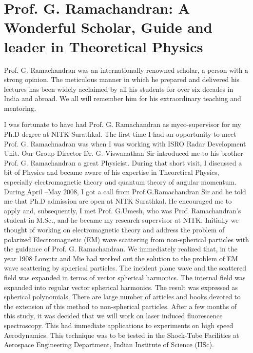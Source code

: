 \chapter{Prof. G. Ramachandran: A Wonderful Scholar, Guide and leader in Theoretical Physics}


\vspace{-.4cm}

Prof. G. Ramachandran was an internationally renowned scholar, a person with a strong opinion. The meticulous manner in which he prepared and delivered his lectures has been widely acclaimed by all his students for over six decades in India and abroad. We all will remember him for his extraordinary teaching and mentoring.

\medskip

I was fortunate to have had Prof. G. Ramachandran as my\break co-supervisor for my Ph.D degree at NITK Surathkal. The first time I had an opportunity to meet Prof. G. Ramachnadran was when I was working with ISRO Radar Development Unit. Our Group Director Dr. G. Viswanathan Sir introduced me to his brother Prof. G. Ramachandran a great Physicist. During that short visit, I discussed a bit of Physics and became aware of his expertise in Theoretical Physics, especially electromagnetic theory and quantum theory of angular momentum. During April --May 2008, I got a call from Prof.G.Ramachandran Sir and he told me that Ph.D admission are open at NITK Surathkal. He encouraged me to apply and, subsequently, I met Prof. G.Umesh, who was Prof. Ramachandran's student in M.Sc., and he became my research supervisor at NITK. Initially we thought of working on electromagnetic theory and address the problem of polarized Electromagnetic (EM) wave scattering from non-spherical particles with the guidance of Prof. G. Ramachandran. We immediately realized that, in the year 1908 Lorentz and Mie had worked out the solution to the problem of EM wave scattering by spherical particles. The incident plane wave and the scattered field was expanded in terms of vector spherical harmonics. The internal field was expanded into regular vector spherical harmonics. The result was expressed as spherical polynomials. There are large number of articles and books devoted to the extension of this method to non-spherical particles. After a few months of this study, it was decided that we will work on  laser induced fluorescence spectroscopy. This had immediate applications to experiments on high speed Aerodynamics. This technique was to be tested in the Shock-Tube Facilities at Aerospace Engineering Department, Indian Institute of Science (IISc).

